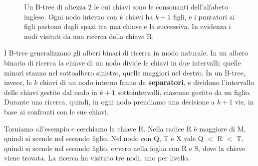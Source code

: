 \begin{figure}[htbp]
\centering
{}
\caption{Un B-tree di altezza $2$ le cui chiavi sono le consonanti dell'alfabeto inglese. Ogni nodo interno con $k$ chiavi ha $k+1$ figli, e i puntatori ai figli partono dagli spazi tra una chiave e la successiva. In evidenza i nodi visitati da una ricerca della chiave R.}
\label{fig:btree-esempio}
\end{figure}

I B-tree generalizzano gli alberi binari di ricerca in modo naturale. In un albero binario di ricerca la chiave di un nodo divide le chiavi in due intervalli: quelle minori stanno nel sottoalbero sinistro, quelle maggiori nel destro. In un B-tree, invece, le $k$ chiavi di un nodo interno fanno da \textbf{separatori}, e dividono l'intervallo delle chiavi gestite dal nodo in $k+1$ sottointervalli, ciascuno gestito da un figlio. Durante una ricerca, quindi, in ogni nodo prendiamo una decisione a $k+1$ vie, in base ai confronti con le sue chiavi.

Torniamo all'esempio e cerchiamo la chiave R. Nella radice R è maggiore di M, quindi si scende nel secondo figlio. Nel nodo con Q, T e X vale Q $<$ R $<$ T, quindi si scende nel secondo figlio, ovvero nella foglia con R e S, dove la chiave viene trovata. La ricerca ha visitato tre nodi, uno per livello.

